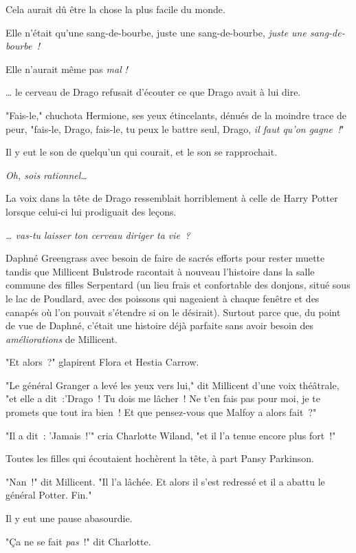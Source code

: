 Cela aurait dû être la chose la plus facile du monde.

Elle n'était qu'une sang-de-bourbe, juste une sang-de-bourbe, \emph{juste une sang-de-bourbe~!}

Elle n'aurait même pas \emph{mal} \emph{!}

… le cerveau de Drago refusait d'écouter ce que Drago avait à lui dire.

"Fais-le," chuchota Hermione, ses yeux étincelants, dénués de la moindre trace de peur, "fais-le, Drago, fais-le, tu peux le battre seul, Drago, \emph{il faut qu'on gagne~!}"

Il y eut le son de quelqu'un qui courait, et le son se rapprochait.

\emph{Oh, sois rationnel…}

La voix dans la tête de Drago ressemblait horriblement à celle de Harry Potter lorsque celui-ci lui prodiguait des leçons.

\emph{… vas-tu laisser ton cerveau diriger ta vie~?}


Daphné Greengrass avec besoin de faire de sacrés efforts pour rester muette tandis que Millicent Bulstrode racontait à nouveau l'histoire dans la salle commune des filles Serpentard (un lieu frais et confortable des donjons, situé sous le lac de Poudlard, avec des poissons qui nageaient à chaque fenêtre et des canapés où l'on pouvait s'étendre si on le désirait). Surtout parce que, du point de vue de Daphné, c'était une histoire déjà parfaite sans avoir besoin des \emph{améliorations} de Millicent.

"Et alors~?" glapirent Flora et Hestia Carrow.

"Le général Granger a levé les yeux vers lui," dit Millicent d'une voix théâtrale, "et elle a dit~:'Drago~! Tu dois me lâcher~! Ne t'en fais pas pour moi, je te promets que tout ira bien~! Et que pensez-vous que Malfoy a alors fait~?"

"Il a dit~: 'Jamais~!'" cria Charlotte Wiland, "et il l'a tenue encore plus fort~!"

Toutes les filles qui écoutaient hochèrent la tête, à part Pansy Parkinson.

"Nan~!" dit Millicent. "Il l'a lâchée. Et alors il s'est redressé et il a abattu le général Potter. Fin."

Il y eut une pause abasourdie.

"Ça ne se fait \emph{pas}~!" dit Charlotte.

